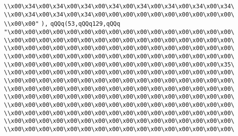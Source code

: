 \verb|\\x00\x34\x00\x34\x00\x34\x00\x34\x00\x34\x00\x34\x00\x34\x00\x34\|\newline
\verb|\\x00\x34\x00\x34\x00\x34\x00\x00\x00\x00\x00\x00\x00\x00\x00\x00\|\newline
\verb|\\x00\x00"|\newline
\verb|),|\newline
\verb|qQQq(53,qQQq129,qQQq|\newline
\verb|"\x00\x00\x00\x00\x00\x00\x00\x00\x00\x00\x00\x00\x00\x00\x00\x00\|\newline
\verb|\\x00\x00\x00\x00\x00\x00\x00\x00\x00\x00\x00\x00\x00\x00\x00\x00\|\newline
\verb|\\x00\x00\x00\x00\x00\x00\x00\x00\x00\x00\x00\x00\x00\x00\x00\x00\|\newline
\verb|\\x00\x00\x00\x00\x00\x00\x00\x00\x00\x00\x00\x00\x00\x00\x00\x00\|\newline
\verb|\\x00\x00\x00\x00\x00\x00\x00\x00\x00\x00\x00\x00\x00\x00\x00\x35\|\newline
\verb|\\x00\x00\x00\x00\x00\x00\x00\x00\x00\x00\x00\x00\x00\x00\x00\x00\|\newline
\verb|\\x00\x00\x00\x00\x00\x00\x00\x00\x00\x00\x00\x00\x00\x00\x00\x00\|\newline
\verb|\\x00\x00\x00\x00\x00\x00\x00\x00\x00\x00\x00\x00\x00\x00\x00\x00\|\newline
\verb|\\x00\x00\x00\x00\x00\x00\x00\x00\x00\x00\x00\x00\x00\x00\x00\x00\|\newline
\verb|\\x00\x00\x00\x00\x00\x00\x00\x00\x00\x00\x00\x00\x00\x00\x00\x00\|\newline
\verb|\\x00\x00\x00\x00\x00\x00\x00\x00\x00\x00\x00\x00\x00\x00\x00\x00\|\newline
\verb|\\x00\x00\x00\x00\x00\x00\x00\x00\x00\x00\x00\x00\x00\x00\x00\x00\|\newline
\verb|\\x00\x00\x00\x00\x00\x00\x00\x00\x00\x00\x00\x00\x00\x00\x00\x00\|\newline
